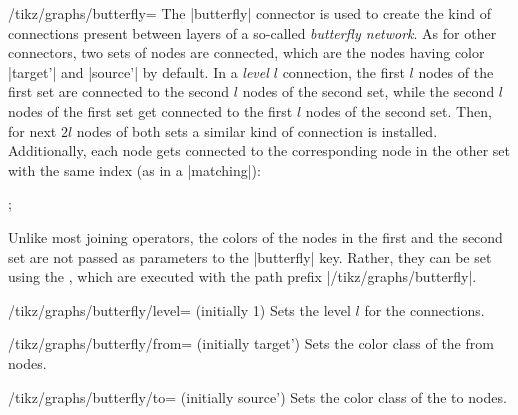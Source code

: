 \begin{key}{/tikz/graphs/butterfly=}
    The |butterfly| connector is used to create the kind of connections present
    between layers of a so-called \emph{butterfly network}. As for other
    connectors, two sets of nodes are connected, which are the nodes having
    color |target'| and |source'| by default. In a \emph{level $l$} connection,
    the first $l$ nodes of the first set are connected to the second $l$ nodes
    of the second set, while the second $l$ nodes of the first set get
    connected to the first $l$ nodes of the second set. Then, for next $2l$
    nodes of both sets a similar kind of connection is installed. Additionally,
    each node gets connected to the corresponding node in the other set with
    the same index (as in a |matching|):
\begin{codeexample}[]
\tikz {};
\end{codeexample}
    Unlike most joining operators, the colors of the nodes in the first and the
    second set are not passed as parameters to the |butterfly| key. Rather,
    they can be set using the , which are executed with the path
    prefix |/tikz/graphs/butterfly|.
    \begin{key}{/tikz/graphs/butterfly/level= (initially 1)}
        Sets the level $l$ for the connections.
    \end{key}
    \begin{key}{/tikz/graphs/butterfly/from= (initially target')}
        Sets the color class of the from nodes.
    \end{key}
    \begin{key}{/tikz/graphs/butterfly/to= (initially source')}
        Sets the color class of the to nodes.
    \end{key}
\end{key}


